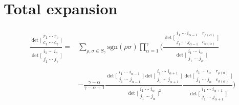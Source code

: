 \documentclass{amsart}
\begin{document}
\section{Total expansion}
{
    \begin{equation*}
        \begin{split}
            \frac{\det\big[\begin{smallmatrix}
                r_1\;\cdots\;r_\gamma\\
                c_1\;\cdots\;c_\gamma
            \end{smallmatrix}\big]}{\det\big[\begin{smallmatrix}
                i_1\;\cdots\;i_\gamma\\
                j_1\;\cdots\;j_\gamma
            \end{smallmatrix}\big]}={}&\sum_{\rho,\sigma\in S_\gamma}\mathrm{sgn}(\rho\sigma)\prod_{\alpha=1}^\gamma\Bigg(\frac{\det\big[\begin{smallmatrix}
                i_1\;\cdots\;i_{\alpha-1}&r_{\rho(\alpha)}\\
                j_1\;\cdots\;j_{\alpha-1}&c_{\sigma(\alpha)}
            \end{smallmatrix}\big]}{\det\big[\begin{smallmatrix}
                i_1\;\cdots\;i_\alpha\\
                j_1\;\cdots\;j_\alpha
            \end{smallmatrix}\big]}\\
            &-\frac{\gamma-\alpha}{\gamma-\alpha+1}\frac{\det\big[\begin{smallmatrix}
                i_1\;\cdots\;i_{\alpha-1}\\
                j_1\;\cdots\;j_{\alpha-1}
            \end{smallmatrix}\big]{\det\big[\begin{smallmatrix}
                i_1\;\cdots\;i_{\alpha+1}\\
                j_1\;\cdots\;j_{\alpha+1}
            \end{smallmatrix}\big]}}{\det\big[\begin{smallmatrix}
                i_1\;\cdots\;i_\alpha\\
                j_1\;\cdots\;j_\alpha
            \end{smallmatrix}\big]^2}\frac{\det\big[\begin{smallmatrix}
                i_1\;\cdots\;i_\alpha&r_{\rho(\alpha)}\\
                j_1\;\cdots\;j_\alpha&c_{\sigma(\alpha)}
            \end{smallmatrix}\big]}{\det\big[\begin{smallmatrix}
                i_1\;\cdots\;i_{\alpha+1}\\
                j_1\;\cdots\;j_{\alpha+1}
            \end{smallmatrix}\big]}\Bigg)
        \end{split}
    \end{equation*}
}
\end{document}
